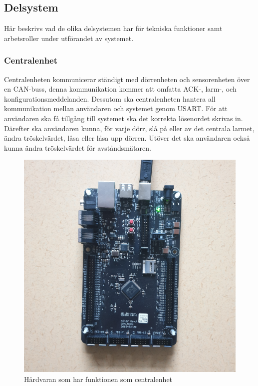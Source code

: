 \documentclass{article}
\begin{document}
\subsection{Delsystem}
Här beskrivs vad de olika delsystemen har för tekniska funktioner samt arbetsroller under utförandet av systemet. 

\subsubsection{Centralenhet}
Centralenheten kommunicerar ständigt med dörrenheten och sensorenheten över en CAN-buss, denna kommunikation kommer att omfatta ACK-, larm-, och konfigurationsmeddelanden. 
Dessutom ska centralenheten hantera all kommunikation mellan användaren och systemet genom USART. För att användaren ska få tillgång till systemet ska det korrekta lösenordet skrivas in. 
Därefter ska användaren kunna, för varje dörr, slå på eller av det centrala larmet, ändra tröskelvärdet, låsa eller låsa upp dörren. 
Utöver det ska användaren också kunna ändra tröskelvärdet för avståndsmätaren.

\begin{figure}[h]
    \centering
    \includegraphics[scale=0.05]{Projektrapport/central.png}
    \caption {Hårdvaran som har funktionen som centralenhet}
    \label{fig:drawing}
\end{figure}
\end{document}
